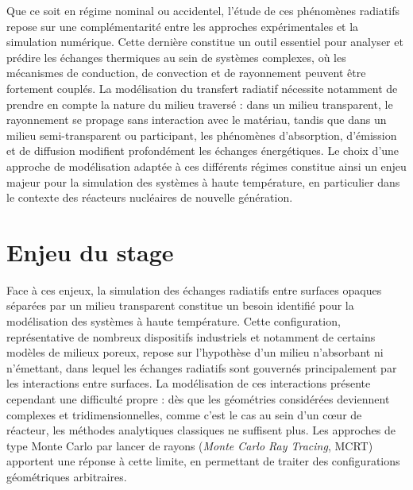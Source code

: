 Que ce soit en régime nominal ou accidentel, l'étude de ces phénomènes radiatifs repose sur une complémentarité entre les approches expérimentales et la simulation numérique. Cette dernière constitue un outil essentiel pour analyser et prédire les échanges thermiques au sein de systèmes complexes, où les mécanismes de conduction, de convection et de rayonnement peuvent être fortement couplés. La modélisation du transfert radiatif nécessite notamment de prendre en compte la nature du milieu traversé : dans un milieu transparent, le rayonnement se propage sans interaction avec le matériau, tandis que dans un milieu semi-transparent ou participant, les phénomènes d'absorption, d'émission et de diffusion modifient profondément les échanges énergétiques. Le choix d'une approche de modélisation adaptée à ces différents régimes constitue ainsi un enjeu majeur pour la simulation des systèmes à haute température, en particulier dans le contexte des réacteurs nucléaires de nouvelle génération.

\section{Enjeu du stage}

Face à ces enjeux, la simulation des échanges radiatifs entre surfaces opaques séparées par un milieu transparent constitue un besoin identifié pour la modélisation des systèmes à haute température. Cette configuration, représentative de nombreux dispositifs industriels et notamment de certains modèles de milieux poreux, repose sur l'hypothèse d'un milieu n'absorbant ni n'émettant, dans lequel les échanges radiatifs sont gouvernés principalement par les interactions entre surfaces. La modélisation de ces interactions présente cependant une difficulté propre : dès que les géométries considérées deviennent complexes et tridimensionnelles, comme c'est le cas au sein d'un cœur de réacteur, les méthodes analytiques classiques ne suffisent plus. Les approches de type Monte Carlo par lancer de rayons (\textit{Monte Carlo Ray Tracing}, MCRT) apportent une réponse à cette limite, en permettant de traiter des configurations géométriques arbitraires.

